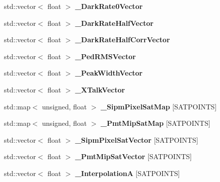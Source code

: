 \begin{DoxyCompactItemize}
\item 
std\-::vector$<$ float $>$ {\bfseries \-\_\-\-Dark\-Rate0\-Vector}\label{classCALICE_1_1SiPmPropertiesProcessor_a9f1349bd2083fc0c83a637e3fec5cbe9}

\item 
std\-::vector$<$ float $>$ {\bfseries \-\_\-\-Dark\-Rate\-Half\-Vector}\label{classCALICE_1_1SiPmPropertiesProcessor_a4e424b5ebbb1f20d053d3865be63f53e}

\item 
std\-::vector$<$ float $>$ {\bfseries \-\_\-\-Dark\-Rate\-Half\-Corr\-Vector}\label{classCALICE_1_1SiPmPropertiesProcessor_a6111cc7e9b04e0855f48b4ec5b758190}

\item 
std\-::vector$<$ float $>$ {\bfseries \-\_\-\-Ped\-R\-M\-S\-Vector}\label{classCALICE_1_1SiPmPropertiesProcessor_abc8201a9b8ebbfd0943863c3ea44d988}

\item 
std\-::vector$<$ float $>$ {\bfseries \-\_\-\-Peak\-Width\-Vector}\label{classCALICE_1_1SiPmPropertiesProcessor_ac51ad1f3b42c8d4e6ed22a578cab93e1}

\item 
std\-::vector$<$ float $>$ {\bfseries \-\_\-\-X\-Talk\-Vector}\label{classCALICE_1_1SiPmPropertiesProcessor_aaed7eb60832cf27397c07d29f02b3655}

\item 
std\-::map$<$ unsigned, float $>$ {\bfseries \-\_\-\-Sipm\-Pixel\-Sat\-Map} [S\-A\-T\-P\-O\-I\-N\-T\-S]\label{classCALICE_1_1SiPmPropertiesProcessor_aac2e9c79a36b6b8a2142f90a43d49ac0}

\item 
std\-::map$<$ unsigned, float $>$ {\bfseries \-\_\-\-Pmt\-Mip\-Sat\-Map} [S\-A\-T\-P\-O\-I\-N\-T\-S]\label{classCALICE_1_1SiPmPropertiesProcessor_af66eeb8207a9f06138ebdd3691ca87b3}

\item 
std\-::vector$<$ float $>$ {\bfseries \-\_\-\-Sipm\-Pixel\-Sat\-Vector} [S\-A\-T\-P\-O\-I\-N\-T\-S]\label{classCALICE_1_1SiPmPropertiesProcessor_a7ffbe1262a0e69b16409c0a0b6f6d7dc}

\item 
std\-::vector$<$ float $>$ {\bfseries \-\_\-\-Pmt\-Mip\-Sat\-Vector} [S\-A\-T\-P\-O\-I\-N\-T\-S]\label{classCALICE_1_1SiPmPropertiesProcessor_ab16b4671505857cddbd7bed4e0976677}

\item 
std\-::vector$<$ float $>$ {\bfseries \-\_\-\-Interpolation\-A} [S\-A\-T\-P\-O\-I\-N\-T\-S]\label{classCALICE_1_1SiPmPropertiesProcessor_acba8a855860b9dcf60e7d2af825f6ffb}


\end{DoxyCompactItemize}
